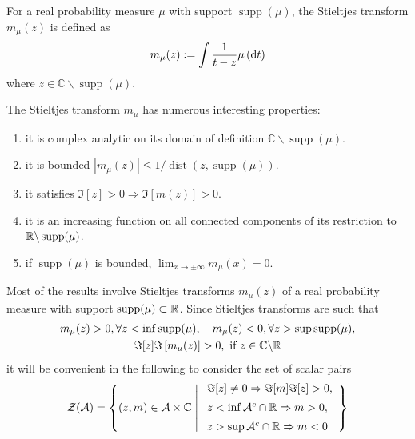 \begin{definition}
	For a real probability measure \(\mu\) with support \(\operatorname{supp}(\mu)\), the Stieltjes transform \(m_{\mu}(z)\) is defined as
	\begin{equation}
		m_{\mu}(z):=\int\frac{1}{t-z}\mu\left(\mathop{}\!\mathrm{d} t\right)
	\end{equation}
	where \(z\in\mathbb{C}\backslash\operatorname{supp}(\mu)\).
\end{definition}

\begin{property}
	The Stieltjes transform \(m_{\mu}\) has numerous interesting properties:
	\begin{enumerate}
		\item it is complex analytic on its domain of definition \(\mathbb{C} \backslash \operatorname{supp}(\mu)\).
		\item it is bounded \(\left|m_{\mu}(z)\right|\leq 1/\operatorname{dist}(z,\operatorname{supp}(\mu))\).
		\item it satisfies \(\Im[z]>0 \Rightarrow \Im[m(z)]>0\).
		\item it is an increasing function on all connected components of its restriction to \(\mathbb{R}\backslash\operatorname{supp}(\mu)\). %
		\item if \(\operatorname{supp}(\mu)\) is bounded, \(\lim_{x\rightarrow\pm\infty}m_{\mu}(x)=0\).
	\end{enumerate}
\end{property}

\begin{remark}
	Most of the results involve Stieltjes transforms \(m_{\mu}(z)\) of a real probability measure with support \(\operatorname{supp}(\mu) \subset \mathbb{R}\). Since Stieltjes transforms are such that
	\begin{gather*}
		m_{\mu}(z)>0,\forall z<\inf\operatorname{supp}(\mu),\quad m_{\mu}(z)<0,\forall z>\sup \operatorname{supp}(\mu),\\
		\Im[z] \Im\left[m_{\mu}(z)\right]>0,\ \text{if}\ z\in\mathbb{C}\backslash\bbR
	\end{gather*}
	it will be convenient in the following to consider the set of scalar pairs
	\begin{equation*}
		\mathcal{Z}(\mathcal{A}) = \left\{
		(z, m) \in \mathcal{A} \times \mathbb{C} \;\middle|\;
		\begin{array}{l}
			\Im[z] \neq 0 \Rightarrow \Im[m] \Im[z] > 0,          \\[0.5em]
			z < \inf \mathcal{A}^{c} \cap \mathbb{R} \Rightarrow m > 0, \\[0.5em]
			z > \sup \mathcal{A}^{c} \cap \mathbb{R} \Rightarrow m < 0
		\end{array}
		\right\}
	\end{equation*}
\end{remark}

